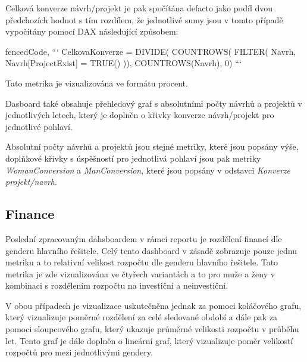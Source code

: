 \documentclass[
  digital,     %
  twoside,     %
  lof,         %
  lot,         %
]{fithesis4}
\begin{document}
Celková konverze návrh/projekt je pak spočítána defacto jako podíl dvou předchozích hodnot s tím rozdílem, že jednotlivé sumy jsou v tomto případě vypočítány pomocí DAX následující způsobem:
\begin{tcolorbox}
\begin{markdown*}{%
  fencedCode,
}
```
CelkovaKonverze = DIVIDE(
                    COUNTROWS(
                        FILTER(
                          Navrh,
                          Navrh[ProjectExist] = TRUE()
                        )),
                        COUNTROWS(Navrh),
                        0)
```
\end{markdown*} 
\end{tcolorbox}

Tato metrika je vizualizována ve formátu procent.


Dasboard také obsahuje přehledový graf s absolutními počty návrhů a projektů v jednotlivých letech, který je doplněn o křivky konverze návrh/projekt pro jednotlivé pohlaví.

Absolutní počty návrhů a projektů jsou stejné metriky, které jsou popsány výše, doplňkové křivky s úspěšností pro jednotlivá pohlaví jsou pak metriky \emph{WomanConversion} a \emph{ManConversion}, které jsou popsány v odstavci \emph{Konverze projekt/navrh}.

\subsection{Finance}
Poslední zpracovaným dahsboardem v rámci reportu je rozdělení financí dle genderu hlavního řešitele. Celý tento dashboard v zásadě zobrazuje pouze jednu metriku a to relativní velikost rozpočtu dle genderu hlavního řešitele. Tato metrika je zde vizualizována ve čtyřech variantách a to pro muže a ženy v kombinaci s rozdělením rozpočtu na investiční a neinvestiční.  

V obou případech je vizualizace uskutečněna jednak za pomoci koláčového grafu, který vizualizuje poměrné rozdělení za celé sledované období a dále pak za pomoci sloupcového grafu, který ukazuje průměrné velikosti rozpočtu v průběhu let. Tento graf je dále doplněn o lineární graf, který vizualizuje poměr velikostí rozpočtů pro mezi jednotlivými gendery.
\end{document}
